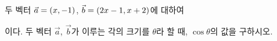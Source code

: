 두 벡터 $\vec{a}=(x{,}\mkern3mu\mathopen{}-1)$, $\vec{b}=(2x-1{,}\mkern3mu\mathopen{}x+2)$에 대하여 \par\smallskip{}\par\smallskip\noindent 이다. 두 벡터 $\vec{a}$, $\vec{b}$가 이루는 각의 크기를 $\theta$라 할 때, $\cos\theta$의 값을 구하시오. 
